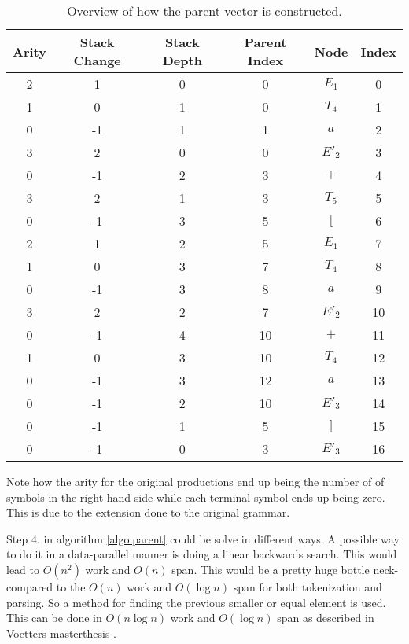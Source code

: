 \documentclass[a4paper,12pt]{article}
\theoremstyle{definition}
\begin{document}
\begin{table}[H]
  \centering
  \begin{tabular}{c|c|c|c|c|c}
    Arity & Stack Change & Stack Depth & Parent Index & Node & Index \\ \hline
    2 & 1  & 0 & 0  & $E_1$  & 0  \\ \hline
    1 & 0  & 1 & 0  & $T_4$  & 1  \\ \hline
    0 & -1 & 1 & 1  & $a$    & 2  \\ \hline
    3 & 2  & 0 & 0  & $E'_2$ & 3  \\ \hline
    0 & -1 & 2 & 3  & $+$    & 4  \\ \hline
    3 & 2  & 1 & 3  & $T_5$  & 5  \\ \hline
    0 & -1 & 3 & 5  & $[$    & 6  \\ \hline
    2 & 1  & 2 & 5  & $E_1$  & 7  \\ \hline
    1 & 0  & 3 & 7  & $T_4$  & 8  \\ \hline
    0 & -1 & 3 & 8  & $a$    & 9  \\ \hline
    3 & 2  & 2 & 7  & $E'_2$ & 10 \\ \hline
    0 & -1 & 4 & 10 & $+$    & 11 \\ \hline
    1 & 0  & 3 & 10 & $T_4$  & 12 \\ \hline
    0 & -1 & 3 & 12 & $a$    & 13 \\ \hline
    0 & -1 & 2 & 10 & $E'_3$ & 14 \\ \hline
    0 & -1 & 1 & 5  & $]$    & 15 \\ \hline
    0 & -1 & 0 & 3  & $E'_3$ & 16
  \end{tabular}
  \caption{Overview of how the parent vector is constructed.}
\end{table}
Note how the arity for the original productions end up being the number of of symbols in the right-hand side while each terminal symbol ends up being zero. This is due to the extension done to the original grammar.

Step 4. in algorithm \ref{algo:parent} could be solve in different ways. A possible way to do it in a data-parallel manner is doing a linear backwards search. This would lead to $O(n^2)$ work and $O(n)$ span. This would be a pretty huge bottle neck-compared to the $O(n)$ work and $O(\log n)$ span for both tokenization and parsing. So a method for finding the previous smaller or equal element is used. This can be done in $O(n \log n)$ work and $O(\log n)$ span as described in Voetters masterthesis \cite[32-33]{voetter2021}.
\end{document}
